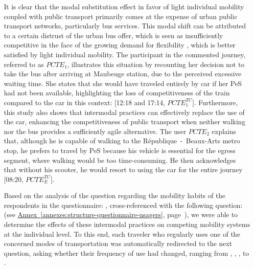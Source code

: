 \begin{refsegment}
It is clear that the modal substitution effect in favor of light individual mobility coupled with public transport primarily comes at the expense of urban public transport networks, particularly bus services. This modal shift can be attributed to a certain distrust of the urban bus offer, which is seen as insufficiently competitive in the face of the growing demand for flexibility \textcolor{blue}{\autocite[19-24]{bauman_liquid_2000}}, which is better satisfied by light individual mobility. The participant in the commented journey, referred to as \(PCTE_{1}\), illustrates this situation by recounting her decision not to take the bus after arriving at Maubeuge station, due to the perceived excessive waiting time. She states that she would have traveled entirely by car if her \acrshort{PeS} had not been available, highlighting the loss of competitiveness of the train compared to the car in this context:  [12:18 and 17:14, \(PCTE^{TC}_{1}\)]. Furthermore, this study also shows that intermodal practices can effectively replace the use of the car, enhancing the competitiveness of public transport when neither walking nor the bus provides a sufficiently agile alternative. The user \(PCTE_{2}\) explains that, although he is capable of walking to the République~-~Beaux-Arts metro stop, he prefers to travel by \acrshort{PeS} because his vehicle is essential for the egress segment, where walking would be too time-consuming. He then acknowledges that without his scooter, he would resort to using the car for the entire journey [08:20, \(PCTE^{TC}_{E}\)].%

Based on the analysis of the question regarding the mobility habits of the respondents in the questionnaire: , cross-referenced with the following question:  (see \hyperref[annexes:structure-questionnaire-usagers]{Annex~\ref{annexes:structure-questionnaire-usagers}}, page~\pageref{annexes:structure-questionnaire-usagers}), we were able to determine the effects of these intermodal practices on competing mobility systems at the individual level. To this end, each traveler who regularly uses one of the concerned modes of transportation was automatically redirected to the next question, asking whether their frequency of use had changed, ranging from , , ,  to .%


\end{refsegment}
